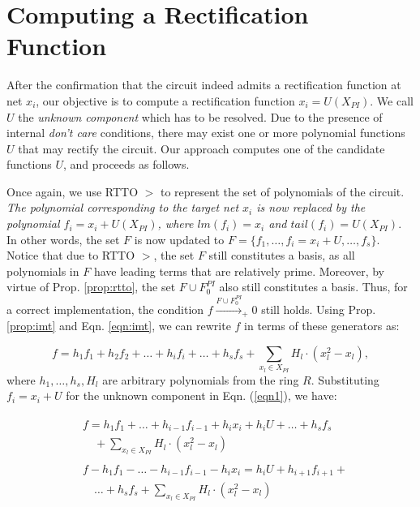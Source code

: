 \section{Computing a Rectification Function}
\label{sec:unknown}

After the confirmation that the circuit indeed admits a rectification
function at net $x_i$, our objective is to compute a rectification
function $x_i = U(X_{PI})$. We call $U$ the {\it unknown component}
which has to be resolved. Due to the presence of internal {\it don't
  care} conditions, there may exist one or more polynomial functions
$U$ that may rectify the circuit. Our approach computes one of the
candidate functions $U$, and proceeds as follows.


Once again, we use RTTO $>$ to represent the set
of polynomials of the circuit. {\it The polynomial corresponding to the
target net $x_i$ is now replaced by the polynomial $f_i = x_i + U(X_{PI})$,
where $lm(f_i) = x_i$ and $tail(f_i)=U(X_{PI})$}. In other words, the
set $F$ is now updated to
$F=\{f_1,\dots,f_i=x_i+U,\dots,f_s\}$. Notice that due to RTTO $>$, 
the set $F$ still constitutes a \Grobner basis, as all 
polynomials in $F$ have leading terms that are relatively
prime. Moreover, by virtue of Prop. \ref{prop:rtto}, the set $F\cup
F_{0}^{PI}$ also still constitutes a \Grobner basis. 
Thus, for a correct implementation, the condition $f\xrightarrow{F\cup
  F_{0}^{PI}}_+0$ still holds. Using Prop. 
\ref{prop:imt} and Eqn. \ref{eqn:imt}, we can rewrite $f$ in terms of
these generators as:    

\begin{equation}\label{eqn1}
f = h_1f_1 + h_2f_2 + \dots+h_if_i+\dots+h_sf_s + \sum_{x_l\in X_{PI}} H_l
\cdot(x_l^2-x_l),
\end{equation}
where $h_1,\dots,h_s,H_l$ are arbitrary polynomials from the ring
$R$. Substituting $f_i = x_i + U$ for the unknown component in
Eqn. (\ref{eqn1}), we have: 

\begin{eqnarray}
  \begin{split}
    & f  = h_1f_1 +\dots+h_{i-1}f_{i-1}+h_ix_i+h_iU+\dots+h_sf_s\\
    & \quad +\sum_{x_l\in X_{PI}} H_l \cdot(x_l^2-x_l)
  \end{split}\\  
  \begin{split}
    & f - h_1f_1 -\dots-h_{i-1}f_{i-1}-h_ix_i = h_iU+h_{i+1}f_{i+1}+\\
    & \quad \dots+h_sf_s +\sum_{x_l\in X_{PI}} H_l \cdot (x_l^2-x_l) \label{eqn2}
\end{split}
\end{eqnarray}

